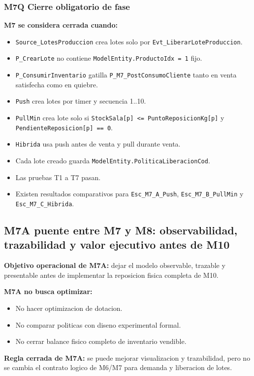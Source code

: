 \documentclass[11pt]{article}
\newcommand{\simio}[1]{\texttt{#1}}
\newcommand{\state}[1]{\texttt{#1}}
\newcommand{\proc}[1]{\texttt{#1}}
\begin{document}
\subsubsection{M7Q Cierre obligatorio de fase}
\textbf{M7 se considera cerrada cuando:}
\begin{itemize}
  \item \simio{Source\_LotesProduccion} crea lotes solo por \simio{Evt\_LiberarLoteProduccion}.
  \item \proc{P\_CrearLote} no contiene \state{ModelEntity.ProductoIdx = 1} fijo.
  \item \proc{P\_ConsumirInventario} gatilla \proc{P\_M7\_PostConsumoCliente} tanto en venta satisfecha como en quiebre.
  \item \simio{Push} crea lotes por timer y secuencia 1..10.
  \item \simio{PullMin} crea lote solo si \state{StockSala[p] <= PuntoReposicionKg[p]} y \state{PendienteReposicion[p] == 0}.
  \item \simio{Hibrida} usa push antes de venta y pull durante venta.
  \item Cada lote creado guarda \state{ModelEntity.PoliticaLiberacionCod}.
  \item Las pruebas T1 a T7 pasan.
  \item Existen resultados comparativos para \simio{Esc\_M7\_A\_Push}, \simio{Esc\_M7\_B\_PullMin} y \simio{Esc\_M7\_C\_Hibrida}.
\end{itemize}

\subsection{M7A puente entre M7 y M8: observabilidad, trazabilidad y valor ejecutivo antes de M10}
\textbf{Objetivo operacional de M7A:} dejar el modelo observable, trazable y presentable antes de implementar la reposicion fisica completa de M10.

\textbf{M7A no busca optimizar:}
\begin{itemize}
  \item No hacer optimizacion de dotacion.
  \item No comparar politicas con diseno experimental formal.
  \item No cerrar balance fisico completo de inventario vendible.
\end{itemize}

\textbf{Regla cerrada de M7A:} se puede mejorar visualizacion y trazabilidad, pero no se cambia el contrato logico de M6/M7 para demanda y liberacion de lotes.
\end{document}
